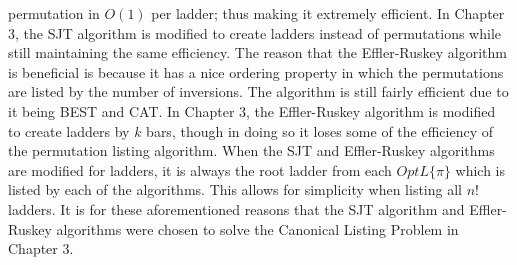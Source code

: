 permutation in $O(1)$ per ladder; thus making it extremely efficient. In Chapter 3, the SJT 
algorithm is modified to create ladders instead of permutations while still maintaining the same efficiency.
The reason that the Effler-Ruskey algorithm 
is beneficial is because it has a nice ordering property in which the permutations are listed by the number of inversions.
The algorithm is still fairly efficient due to it being BEST and CAT. In Chapter 3, the Effler-Ruskey algorithm 
is modified to create ladders by $k$ bars, though in doing so it loses some of the efficiency of the permutation listing algorithm.
When the SJT and Effler-Ruskey algorithms are modified for ladders, it is always the root ladder from each 
$OptL\{\pi\}$ which is listed by each of the algorithms. This allows for simplicity when 
listing all $n!$ ladders. It is for these aforementioned reasons that the SJT algorithm and Effler-Ruskey 
algorithms were chosen to solve the Canonical Listing Problem in Chapter 3.



